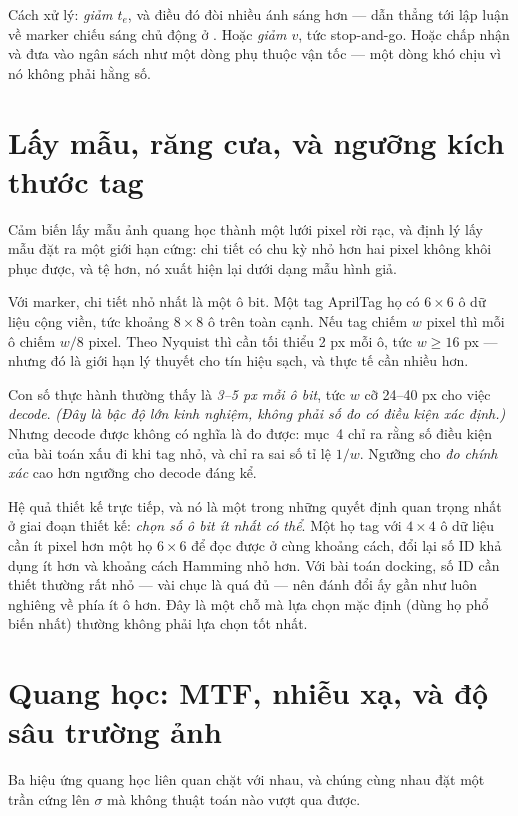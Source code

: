 \documentclass[../../marker.tex]{subfiles}
\begin{document}
Cách xử lý: \emph{giảm \(t_e\)}, và điều đó đòi nhiều ánh sáng hơn --- dẫn thẳng tới lập luận về marker chiếu sáng chủ động ở . Hoặc \emph{giảm \(v\)}, tức stop-and-go. Hoặc chấp nhận và đưa vào ngân sách như một dòng phụ thuộc vận tốc --- một dòng khó chịu vì nó không phải hằng số.

\section{Lấy mẫu, răng cưa, và ngưỡng kích thước tag}

Cảm biến lấy mẫu ảnh quang học thành một lưới pixel rời rạc, và định lý lấy mẫu đặt ra một giới hạn cứng: chi tiết có chu kỳ nhỏ hơn hai pixel không khôi phục được, và tệ hơn, nó xuất hiện lại dưới dạng mẫu hình giả.

Với marker, chi tiết nhỏ nhất là một ô bit. Một tag AprilTag họ  có \(6\times6\) ô dữ liệu cộng viền, tức khoảng \(8\times8\) ô trên toàn cạnh. Nếu tag chiếm \(w\) pixel thì mỗi ô chiếm \(w/8\) pixel. Theo Nyquist thì cần tối thiểu 2 px mỗi ô, tức \(w \ge 16\) px --- nhưng đó là giới hạn lý thuyết cho tín hiệu sạch, và thực tế cần nhiều hơn.

Con số thực hành thường thấy là \emph{3--5 px mỗi ô bit}, tức \(w\) cỡ 24--40 px cho việc \emph{decode}. \emph{(Đây là bậc độ lớn kinh nghiệm, không phải số đo có điều kiện xác định.)} Nhưng decode được không có nghĩa là đo được:  mục~4 chỉ ra rằng số điều kiện của bài toán xấu đi khi tag nhỏ, và  chỉ ra sai số tỉ lệ \(1/w\). Ngưỡng cho \emph{đo chính xác} cao hơn ngưỡng cho decode đáng kể.

Hệ quả thiết kế trực tiếp, và nó là một trong những quyết định quan trọng nhất ở giai đoạn thiết kế: \emph{chọn số ô bit ít nhất có thể}. Một họ tag với \(4\times4\) ô dữ liệu cần ít pixel hơn một họ \(6\times6\) để đọc được ở cùng khoảng cách, đổi lại số ID khả dụng ít hơn và khoảng cách Hamming nhỏ hơn. Với bài toán docking, số ID cần thiết thường rất nhỏ --- vài chục là quá đủ --- nên đánh đổi ấy gần như luôn nghiêng về phía ít ô hơn. Đây là một chỗ mà lựa chọn mặc định (dùng họ phổ biến nhất) thường không phải lựa chọn tốt nhất.

\section{Quang học: MTF, nhiễu xạ, và độ sâu trường ảnh}

Ba hiệu ứng quang học liên quan chặt với nhau, và chúng cùng nhau đặt một trần cứng lên \(\sigma\) mà không thuật toán nào vượt qua được.
\end{document}
